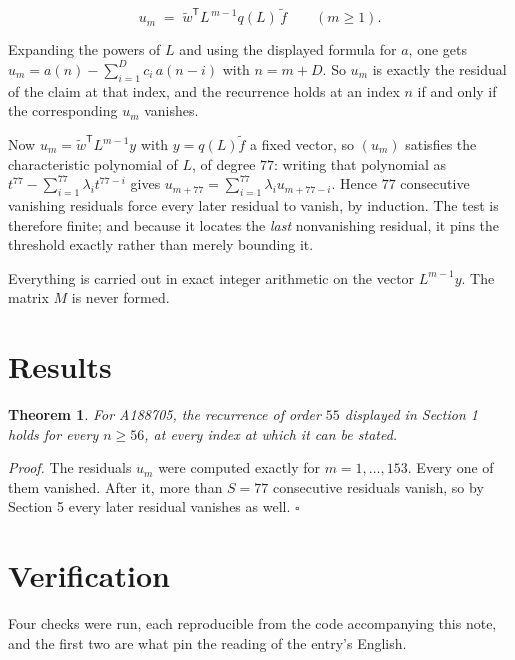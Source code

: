\documentclass[11pt]{article}
\newtheorem{theorem}{Theorem}
\theoremstyle{definition}
\begin{document}
\[u_m \;=\; \tilde w^{\mathsf T} L^{\,m-1} q(L)\,\tilde f \qquad (m \ge 1).\]

Expanding the powers of $L$ and using the displayed formula for $a$, one gets $u_m = a(n) - \sum_{i=1}^{D} c_i\,a(n-i)$ with $n = m + D$. So $u_m$ is exactly the residual of the claim at that index, and the recurrence holds at an index $n$ if and only if the corresponding $u_m$ vanishes.

Now $u_m = \tilde w^{\mathsf T} L^{m-1} y$ with $y = q(L)\tilde f$ a fixed vector, so $(u_m)$ satisfies the characteristic polynomial of $L$, of degree $77$: writing that polynomial as $t^{77} - \sum_{i=1}^{77} \lambda_i t^{77-i}$ gives $u_{m+77} = \sum_{i=1}^{77} \lambda_i u_{m+77-i}$. Hence $77$ consecutive vanishing residuals force every later residual to vanish, by induction. The test is therefore finite; and because it locates the {\itshape last} nonvanishing residual, it pins the threshold exactly rather than merely bounding it.

Everything is carried out in exact integer arithmetic on the vector $L^{m-1}y$. The matrix $M$ is never formed.

\section{Results}

\begin{theorem} For A188705, the recurrence of order $55$ displayed in Section 1 holds for every $n \ge 56$, at every index at which it can be stated.\end{theorem}

{\itshape Proof.} The residuals $u_m$ were computed exactly for $m = 1,\dots,153$. Every one of them vanished. After it, more than $S = 77$ consecutive residuals vanish, so by Section 5 every later residual vanishes as well. $\square$

\section{Verification}

Four checks were run, each reproducible from the code accompanying this note, and the first two are what pin the reading of the entry's English.
\end{document}
